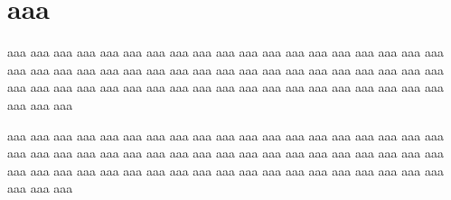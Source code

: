 \documentclass[11pt,a4paper,twoside,openright,titlepage, fleqn,
           headinclude,footinclude,BCOR5mm,%
           numbers=noenddot,cleardoublepage=empty,%
           tablecaptionabove,floatperchapter]{scrreprt}
\numberwithin{equation}{chapter}
\begin{document}
\section{aaa}

aaa aaa aaa aaa aaa aaa aaa aaa aaa aaa aaa aaa 
aaa aaa aaa aaa aaa aaa aaa aaa aaa aaa aaa aaa 
aaa aaa aaa aaa aaa aaa aaa aaa aaa aaa aaa aaa 
aaa aaa aaa aaa aaa aaa aaa aaa aaa aaa aaa aaa 
aaa aaa aaa aaa aaa aaa aaa aaa aaa aaa aaa aaa 


aaa aaa aaa aaa aaa aaa aaa aaa aaa aaa aaa aaa 
aaa aaa aaa aaa aaa aaa aaa aaa aaa aaa aaa aaa 
aaa aaa aaa aaa aaa aaa aaa aaa aaa aaa aaa aaa 
aaa aaa aaa aaa aaa aaa aaa aaa aaa aaa aaa aaa 
aaa aaa aaa aaa aaa aaa aaa aaa aaa aaa aaa aaa 
\end{document}
